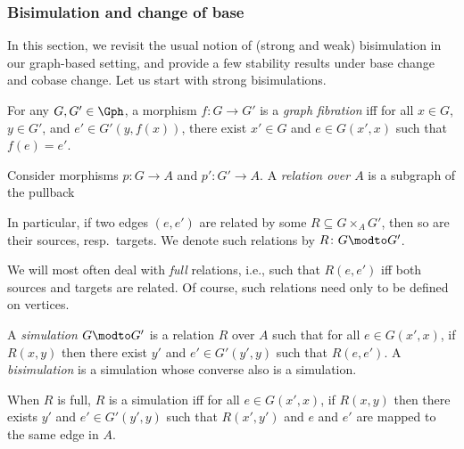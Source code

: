 \documentclass{LMCS}
\theoremstyle{plain}\newtheorem{satz}[thm]{Satz}
\begin{document}
\subsubsection{Bisimulation and change of base} 
In this section, we revisit the usual notion of (strong and weak) bisimulation in our graph-based setting,
and provide a few stability results under base change and cobase change.
Let us start with strong bisimulations.

\begin{defi} For any $G, G' \in \Gph$, a morphism $f \colon G \to G'$
  is a \emph{graph fibration} iff for all $x \in G$, $y \in G'$, and
  $e' \in G' (y,f (x))$, there exist $x' \in G$ and $e \in G (x',x)$
  such that $f (e) = e'$.
\end{defi}


Consider morphisms $p \colon G \to A$ and $p' \colon G' \to A$.  
A \emph{relation over $A$} is a subgraph of the pullback
\begin{center}
\end{center}
In particular, if two edges $(e,e')$ are related by some $R \subseteq
G \times_A G'$, then so are their sources, resp.\ targets.
We denote such relations by $R \colon G \modto G'$.

We will most often deal with \emph{full} relations, i.e., such that
$R(e,e')$ iff both sources and targets are related. Of course, such
relations need only to be defined on vertices.
\begin{defi}
  A \emph{simulation} $G \modto G'$ is a relation $R$ over $A$ such that for all $e
  \in G(x',x)$, if $R(x,y)$ then there exist $y'$ and $e' \in
  G'(y',y)$ such that $R(e,e')$.  A \emph{bisimulation} is a
  simulation whose converse also is a simulation.
\end{defi}
When $R$ is full, $R$ is a simulation iff for all $e \in G(x',x)$, if
$R(x,y)$ then there exists $y'$ and $e' \in G'(y',y)$ such that
$R(x',y')$ and $e$ and $e'$ are mapped to the same edge in $A$.
\end{document}
